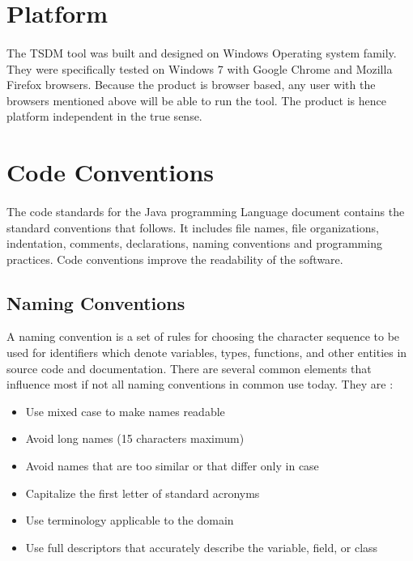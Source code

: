 \documentclass[12pt,a4paper]{report}
\begin{document}
\section{Platform}
\paragraph{}The TSDM tool was built and designed on Windows Operating system family. They were specifically tested on Windows 7 with Google Chrome and Mozilla Firefox browsers. Because the product is browser based, any user with the browsers mentioned above will be able to run the tool. The product is hence platform independent in the true sense.
\section{Code Conventions}
\paragraph{}The code standards for the Java programming Language document contains the standard conventions that follows. It includes file names, file organizations, indentation, comments, declarations, naming conventions and programming practices. Code conventions improve the readability of the software.
\subsection{Naming Conventions}
 A naming convention is a set of rules for choosing the character sequence to be used for identifiers which denote variables, types, functions, and other entities in source code and documentation.  There are several common elements that influence most if not all naming conventions in common use today. They are :
\begin{itemize}
\item Use mixed case to make names readable
\item Avoid long names (15 characters maximum)
\item Avoid names that are too similar or that differ only in case
\item Capitalize the first letter of standard acronyms
\item Use terminology applicable to the domain
\item Use full descriptors that accurately describe the variable, field, or class
\end{itemize}
\end{document}
